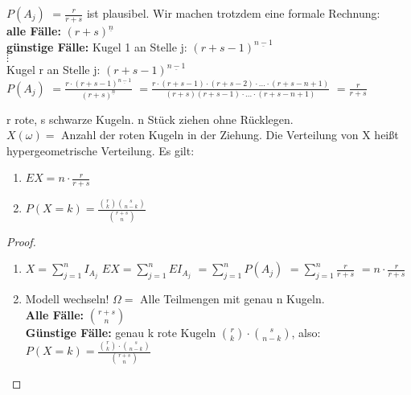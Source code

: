 $P(A_j) $
$= \frac{r}{r+s}$ ist plausibel. Wir machen trotzdem eine formale Rechnung: \\
\textbf{alle Fälle:} $ (r+s)^{\underline{n}} $ \\
\textbf{günstige Fälle:} Kugel 1 an Stelle j: $(r+s-1)^{\underline{n-1}}$\\
$\vdots$\\
Kugel r an Stelle j: $(r+s-1)^{\underline{n-1}}$\\
$P(A_j)$
$=\frac{r \cdot (r+s-1)^{\underline{n-1}} }{(r+s)^{\underline{n}}}$
$=\frac{r\cdot (r+s-1) \cdot (r+s-2) \cdot ...  \cdot  (r+s-n+1)}{(r+s)(r+s-1) \cdot ... \cdot (r+s-n+1)}$
$=\frac{r}{r+s}$

\begin{satz}
r rote, s schwarze Kugeln. n Stück ziehen ohne Rücklegen.\\
$X(\omega) = $ Anzahl der roten Kugeln in der Ziehung. 
Die Verteilung von X heißt hypergeometrische Verteilung. 
Es gilt:
\begin{enumerate}
\item $ E X = n \cdot \frac{r}{r+s}$
\item $ P(X=k) = \frac{\binom r k \binom s {n-k}}{\binom {r+s} n}$
\end{enumerate}
\end{satz}

\begin{proof}
\begin{enumerate}
\item $X = \sum_{j=1}^{n} I_{A_j}$
$ E X = \sum_{j=1}^{n} E I_{A_j} $
$= \sum_{j=1}^{n} P(A_j)$
$= \sum_{j=1}^{n} \frac{r}{r+s}$
$= n \cdot \frac{r}{r+s}$
\item Modell wechseln! $\Omega = $ Alle Teilmengen mit genau n Kugeln.\\
\textbf{Alle Fälle:} $\binom{r+s}{n}$\\
\textbf{Günstige Fälle:} genau k rote Kugeln $\binom r k \cdot \binom{s}{n-k}$, also: 
$P(X=k) = \frac{\binom{r}{k} \cdot \binom{s}{n-k}}{\binom{r+s}{n}}$
\end{enumerate}

\end{proof}